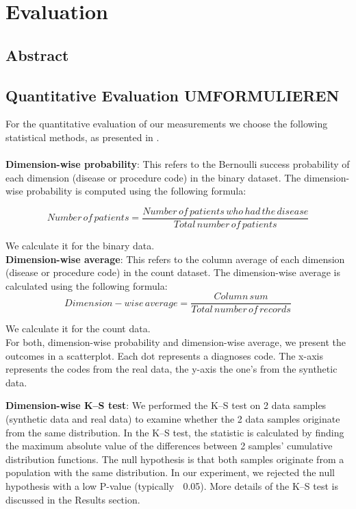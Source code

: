 \documentclass[11pt, a4paper]{book}
\begin{document}
\section{Evaluation}
\subsection{Abstract}
\subsection{Quantitative Evaluation UMFORMULIEREN}
For the quantitative evaluation of our measurements we choose the following statistical methods, as presented in \citep{Choi2017}.
\\
\\
\textbf{Dimension-wise probability}: This refers to the Bernoulli success probability of each dimension (disease or procedure code) in the binary dataset. The dimension-wise probability is computed using the following formula: 

\begin{equation}
Number\,of\,patients = \frac{Number\,of\,patients\, who \,had \,the \,disease}{Total \,number \,of \,patients}
\end{equation}

We calculate it for the binary data.
\\

\textbf{Dimension-wise average}: This refers to the column average of each dimension (disease or procedure code) in the count dataset. The dimension-wise average is calculated using the following formula: 
\begin{equation}
Dimension-wise\,average = \frac{Column \,sum}{Total \,number \,of \,records}
\end{equation}

We calculate it for the count data.
\\
For both, dimension-wise probability and dimension-wise average, we present the outcomes in a scatterplot. Each dot represents a diagnoses code. The x-axis represents the codes from the real data, the y-axis the one's from the synthetic data.

\textbf{Dimension-wise K–S test}: We performed the K–S test on 2 data samples (synthetic data and real data) to examine whether the 2 data samples originate from the same distribution. In the K–S test, the statistic is calculated by finding the maximum absolute value of the differences between 2 samples’ cumulative distribution functions. The null hypothesis is that both samples originate from a population with the same distribution. In our experiment, we rejected the null hypothesis with a low P-value (typically 􏰆 0.05). More details of the K–S test is discussed in the Results section. 
\end{document}

